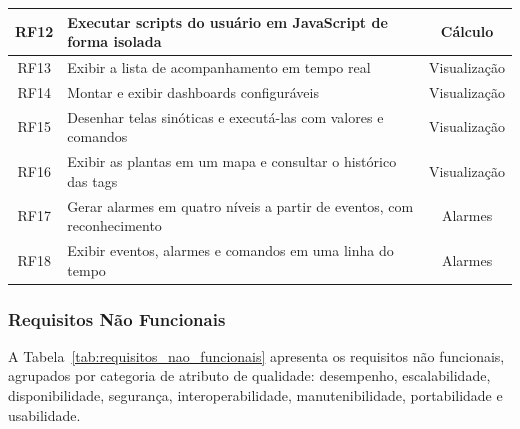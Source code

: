 {\begin{xltabular}{\textwidth}{c>{\centering\arraybackslash}Xc}
        \hline
        RF12        & Executar scripts do usuário em JavaScript de forma isolada            & Cálculo          \\
        \hline
        RF13        & Exibir a lista de acompanhamento em tempo real & Visualização     \\
        \hline
        RF14        & Montar e exibir dashboards configuráveis & Visualização     \\
        \hline
        RF15        & Desenhar telas sinóticas e executá-las com valores e comandos                  & Visualização     \\
        \hline
        RF16        & Exibir as plantas em um mapa e consultar o histórico das tags                             & Visualização     \\
        \hline
        RF17        & Gerar alarmes em quatro níveis a partir de eventos, com reconhecimento   & Alarmes          \\
        \hline
        RF18        & Exibir eventos, alarmes e comandos em uma linha do tempo                                                     & Alarmes          \\
        \hline
\end{xltabular}}

\subsubsection{Requisitos Não Funcionais}

\par A Tabela~\ref{tab:requisitos_nao_funcionais} apresenta os requisitos não funcionais, agrupados por categoria de atributo de qualidade: desempenho, escalabilidade, disponibilidade, segurança, interoperabilidade, manutenibilidade, portabilidade e usabilidade.

